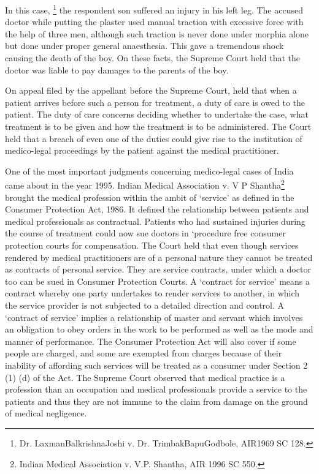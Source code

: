 \begin{multicols}{2}


\noi
In this case, \footnote{Dr. LaxmanBalkrishnaJoshi v. Dr. TrimbakBapuGodbole, AIR1969 SC 128.} the respondent son suffered an injury in his left leg. The accused doctor while putting the plaster used manual traction with excessive force with the help of three men, although such traction is never done under morphia alone but done under proper general anaesthesia. This gave a tremendous shock causing the death of the boy. On these facts, the Supreme Court held that the doctor was liable to pay damages to the parents of the boy.

\noi
On appeal filed by the appellant before the Supreme Court, held that when a patient arrives before
such a person for treatment, a duty of care is owed to the patient. The duty of care concerns
deciding whether to undertake the case, what treatment is to be given and how the treatment is to
be administered. The Court held that a breach of even one of the duties could give rise to the
institution of medico-legal proceedings by the patient against the medical practitioner.


\noi
One of the most important judgments concerning medico-legal cases of India came about in the
year 1995. Indian Medical Association v. V P Shantha\footnote{Indian Medical Association v. V.P. Shantha, AIR 1996 SC 550.} brought the medical profession within the ambit of ‘service’ as defined in the Consumer Protection Act, 1986. It defined the relationship
between patients and medical professionals as contractual. Patients who had sustained injuries
during the course of treatment could now sue doctors in ‘procedure free consumer protection
courts for compensation. The Court held that even though services rendered by medical
practitioners are of a personal nature they cannot be treated as contracts of personal service. They are service contracts, under which a doctor too can be sued in Consumer Protection Courts. A
‘contract for service’ means a contract whereby one party undertakes to render services to another,
in which the service provider is not subjected to a detailed direction and control. A ‘contract of
service’ implies a relationship of master and servant which involves an obligation to obey orders
in the work to be performed as well as the mode and manner of performance. The Consumer
Protection Act will also cover if some people are charged, and some are exempted from charges
because of their inability of affording such services will be treated as a consumer under Section
2 (1) (d) of the Act. The Supreme Court observed that medical practice is a profession than an
occupation and medical professionals provide a service to the patients and thus they are not
immune to the claim from damage on the ground of medical negligence.


\end{multicols}
